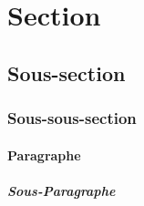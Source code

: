 \section{Section}

\lipsum[1]

\subsection{Sous-section}

\lipsum[2]

\subsubsection{Sous-sous-section}

\lipsum[3]

\paragraph{Paragraphe}

\lipsum[4]

\subparagraph{Sous-Paragraphe}

\lipsum[5]


\lipsum[6]